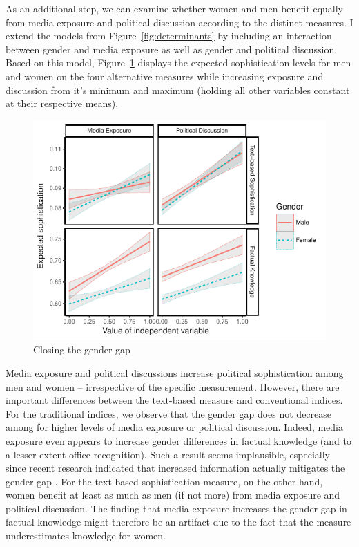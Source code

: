 \documentclass[12pt]{article}
\begin{document}
As an additional step, we can examine whether women and men benefit equally from media exposure and political discussion according to the distinct measures. I extend the models from Figure~\ref{fig:determinants} by including an interaction between gender and media exposure as well as gender and political discussion. Based on this model, Figure~\ref{fig:closing} displays the expected sophistication levels for men and women on the four alternative measures while increasing exposure and discussion from it's minimum and maximum (holding all other variables constant at their respective means).

\begin{figure}[h]\centering
\includegraphics{../fig/closing.pdf}
\caption{Closing the gender gap}\label{fig:closing}
\end{figure}

Media exposure and political discussions increase political sophistication among men and women -- irrespective of the specific measurement. However, there are important differences between the text-based measure and conventional indices. For the traditional indices, we observe that the gender gap does not decrease among for higher levels of media exposure or political discussion. Indeed, media exposure even appears to increase gender differences in factual knowledge (and to a lesser extent office recognition). Such a result seems implausible, especially since recent research indicated that increased information actually mitigates the gender gap \citep{jerit2017revisiting}. For the text-based sophistication measure, on the other hand, women benefit at least as much as men (if not more) from media exposure and political discussion. The finding that media exposure increases the gender gap in factual knowledge might therefore be an artifact due to the fact that the measure underestimates knowledge for women.
\end{document}
